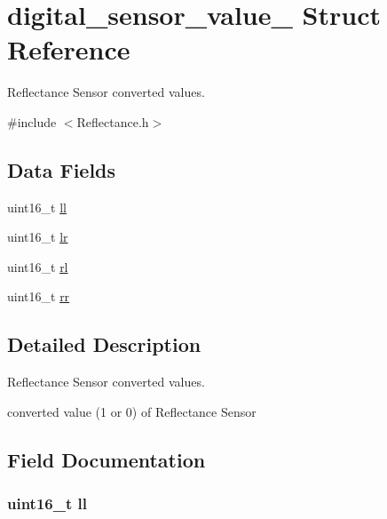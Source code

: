 \hypertarget{structdigital__sensor__value__}{}\section{digital\+\_\+sensor\+\_\+value\+\_\+ Struct Reference}
\label{structdigital__sensor__value__}


Reflectance Sensor converted values.  




{\ttfamily \#include $<$Reflectance.\+h$>$}

\subsection*{Data Fields}
\begin{DoxyCompactItemize}
\item 
uint16\+\_\+t \hyperlink{structdigital__sensor__value___ae59d16ddcc59d6f6633ff99307ff7190}{ll}
\item 
uint16\+\_\+t \hyperlink{structdigital__sensor__value___af650f74b54fbe6d55c96161d2a7098ea}{lr}
\item 
uint16\+\_\+t \hyperlink{structdigital__sensor__value___a55f8b53aee5b41e8af88a816fab2b70b}{rl}
\item 
uint16\+\_\+t \hyperlink{structdigital__sensor__value___a6988d1a89f109b3f8d0e06547a5362f6}{rr}
\end{DoxyCompactItemize}


\subsection{Detailed Description}
Reflectance Sensor converted values. 

converted value (1 or 0) of Reflectance Sensor 

\subsection{Field Documentation}
\subsubsection[{\texorpdfstring{ll}{ll}}]{\setlength{\rightskip}{0pt plus 5cm}uint16\+\_\+t ll}\hypertarget{structdigital__sensor__value___ae59d16ddcc59d6f6633ff99307ff7190}{}\label{structdigital__sensor__value___ae59d16ddcc59d6f6633ff99307ff7190}
